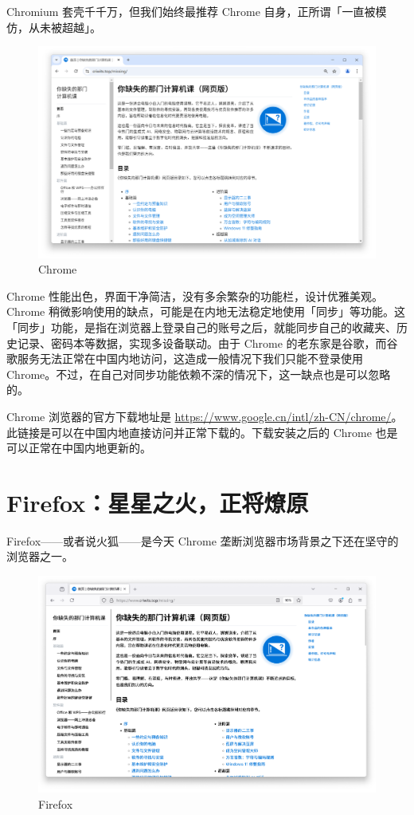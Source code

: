 Chromium 套壳千千万，但我们始终最推荐 Chrome 自身，正所谓「一直被模仿，从未被超越」。

\begin{figure}[htb!]
  \centering
  \includegraphics[width=.75\textwidth]{assets/software/Missing_homepage_in_Chrome.png}
  \caption{Chrome}
  \label{fig:Missing_homepage_in_Chrome}
\end{figure}

Chrome 性能出色，界面干净简洁，没有多余繁杂的功能栏，设计优雅美观。Chrome 稍微影响使用的缺点，可能是在内地无法稳定地使用「同步」等功能。这「同步」功能，是指在浏览器上登录自己的账号之后，就能同步自己的收藏夹、历史记录、密码本等数据，实现多设备联动。由于 Chrome 的老东家是谷歌，而谷歌服务无法正常在中国内地访问，这造成一般情况下我们只能不登录使用 Chrome。不过，在自己对同步功能依赖不深的情况下，这一缺点也是可以忽略的。

Chrome 浏览器的官方下载地址是 \url{https://www.google.cn/intl/zh-CN/chrome/}。此链接是可以在中国内地直接访问并正常下载的。下载安装之后的 Chrome 也是可以正常在中国内地更新的。

\section{Firefox：星星之火，正将燎原}

Firefox——或者说火狐——是今天 Chrome 垄断浏览器市场背景之下还在坚守的浏览器之一。

\begin{figure}[htb!]
  \centering
  \includegraphics[width=.75\textwidth]{assets/software/Missing_homepage_in_Firefox.png}
  \caption{Firefox}
  \label{fig:Missing_homepage_in_Firefox}
\end{figure}

